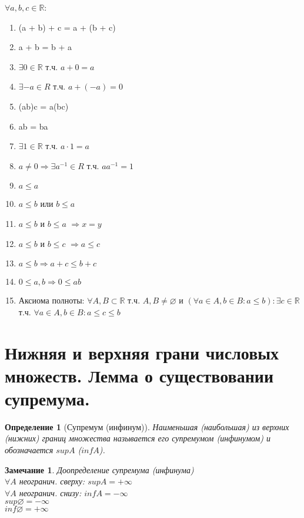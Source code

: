\documentclass[12pt, a4]{article}
\newtheorem*{definition}{Определение}
\newtheorem*{remark}{Замечание}
\renewcommand{\implies}{\Rightarrow}
\renewcommand{\emptyset}{\varnothing}
\newcommand{\R}{\mathbb{R}}
\begin{document}
$\forall a, b, c \in \R$:
\begin{enumerate}
    \item (a + b) + c = a + (b + c)
    \item a + b = b + a
    \item $\exists 0 \in \R$ т.ч. $a + 0 = a$
    \item $\exists -a \in R$ т.ч. $a + (-a) = 0$
    \item (ab)c = a(bc)
    \item ab = ba
    \item $\exists 1 \in \R$ т.ч. $a \cdot 1 = a$
    \item $ a \neq 0 \implies \exists a^{-1} \in R$ т.ч. $aa^{-1} = 1$
    \item $a \leq a$
    \item $a \leq b$ или $b \leq a$
    \item $a \leq b$ и $b \leq a$ $\implies x = y$ 
    \item $a \leq b$ и $b \leq c$ $\implies a \leq c$
    \item $a \leq b \implies a+c \leq b+c$
    \item $0 \leq a,b \implies 0 \leq ab$
    \item Аксиома полноты: $\forall A, B \subset \R$ т.ч. $A, B \neq \emptyset$ и $(\forall a \in A, b \in B: a \leq b): \exists c \in \R$ т.ч. $\forall a \in A, b \in B: a \leq c \leq b$
\end{enumerate}

\section{Нижняя и верхняя грани числовых множеств. Лемма о существовании супремума.}

\begin{definition}[Супремум (инфинум)]
Наименьшая (наибольшая) из верхних (нижних) границ множества называется его супремумом (инфинумом) и обозначается $supA$ ($infA$).
\end{definition}

\begin{remark} Доопределение супремума (инфинума) \\
$\forall A$ неогранич. сверху: $supA = +\infty$\\
$\forall A$ неогранич. снизу: $infA = -\infty$\\
$sup\emptyset = -\infty$\\
$inf\emptyset = +\infty$
\end{remark}
\end{document}
